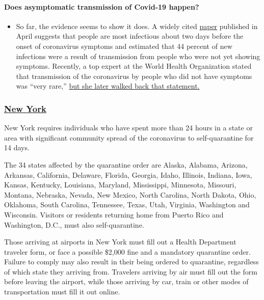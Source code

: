\begin{itemize}
{  \paragraph{Does asymptomatic transmission of Covid-19
  happen?}\label{does-asymptomatic-transmission-of-covid-19-happen}}

  \begin{itemize}
  \tightlist
  \item
    So far, the evidence seems to show it does. A widely cited
    \href{https://www.nature.com/articles/s41591-020-0869-5}{paper}
    published in April suggests that people are most infectious about
    two days before the onset of coronavirus symptoms and estimated that
    44 percent of new infections were a result of transmission from
    people who were not yet showing symptoms. Recently, a top expert at
    the World Health Organization stated that transmission of the
    coronavirus by people who did not have symptoms was ``very rare,''
    \href{https://www.nytimes.com/2020/06/09/world/coronavirus-updates.html?action=click\&pgtype=Article\&state=default\&region=MAIN_CONTENT_3\&context=storylines_faq\#link-1f302e21}{but
    she later walked back that statement.}
  \end{itemize}
\end{itemize}

\hypertarget{new-york}{%
\subsubsection{\texorpdfstring{\href{https://coronavirus.health.ny.gov/covid-19-travel-advisory}{New
York}}{New York}}\label{new-york}}

New York requires individuals who have spent more than 24 hours in a
state or area with significant community spread of the coronavirus to
self-quarantine for 14 days.

The 34 states affected by the quarantine order are Alaska, Alabama,
Arizona, Arkansas, California, Delaware, Florida, Georgia, Idaho,
Illinois, Indiana, Iowa, Kansas, Kentucky, Louisiana, Maryland,
Mississippi, Minnesota, Missouri, Montana, Nebraska, Nevada, New Mexico,
North Carolina, North Dakota, Ohio, Oklahoma, South Carolina, Tennessee,
Texas, Utah, Virginia, Washington and Wisconsin. Visitors or residents
returning home from Puerto Rico and Washington, D.C., must also
self-quarantine.

Those arriving at airports in New York must fill out a Health Department
traveler form, or face a possible \$2,000 fine and a mandatory
quarantine order. Failure to comply may also result in their being
ordered to quarantine, regardless of which state they arriving from.
Travelers arriving by air must fill out the form before leaving the
airport, while those arriving by car, train or other modes of
transportation must fill it out online.

